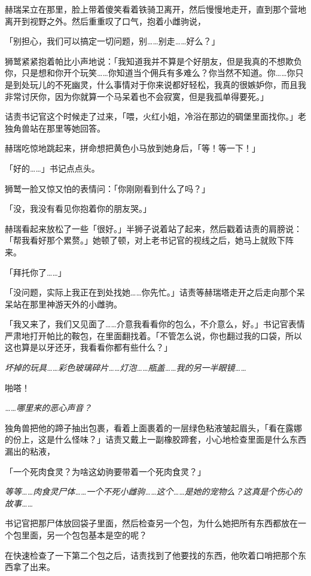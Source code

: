 赫瑞呆立在那里，脸上带着傻笑看着铁骑卫离开，然后慢慢地走开，直到那个营地离开到视野之外。然后重重叹了口气，抱着小雌驹说，

「别担心，我们可以搞定一切问题，别……别走……好么？」

狮鹫紧紧抱着帕比小声地说：「我知道我并不算是个好朋友，但是我真的不想欺负你，只是想和你开个玩笑……你知道当个佣兵有多难么？你当然不知道。你……你只是到处玩儿的不死幽灵，什么事情对于你来说都好轻松，我真的很嫉妒你，而且我非常讨厌你，因为你就算一个马呆着也不会寂寞，但是我孤单得要死。」

诘责书记官这个时候走了过来，「喂，火红小姐，冷浴在那边的碉堡里面找你。」老独角兽站在那里等她回答。

赫瑞吃惊地跳起来，拼命想把黄色小马放到她身后，「等！等一下！」

「好的……」书记点点头。

狮鹫一脸又惊又怕的表情问：「你刚刚看到什么了吗？」

「没，我没有看见你抱着你的朋友哭。」

赫瑞看起来放松了一些「很好。」半狮子说着站了起来，然后戳着诘责的肩膀说：「帮我看好那个累赘。」她顿了顿，对上老书记官的视线之后，她马上就败下阵来。

「拜托你了……」

「没问题，实际上我正在到处找她……你先忙。」诘责等赫瑞塔走开之后走向那个呆呆站在那里神游天外的小雌驹。

「我又来了，我们又见面了……介意我看看你的包么，不介意么，好。」书记官表情严肃地打开帕比的鞍包，在里面翻找着。「不管怎么说，你也翻过我的口袋，所以这也算是以牙还牙，我看看你都有些什么？」

\emph{坏掉的玩具……彩色玻璃碎片……灯泡……瓶盖……我的另一半眼镜……}


啪嗒！

\emph{……哪里来的恶心声音？}

独角兽把他的蹄子抽出包裹，看着上面裹着的一层绿色粘液皱起眉头，「看在露娜的份上，这是什么怪味？」诘责又戴上一副橡胶蹄套，小心地检查里面是什么东西漏出的粘液，

「一个死肉食灵？为啥这幼驹要带着一个死肉食灵？」

\emph{等等……肉食灵尸体……一个不死小雌驹……这个……是她的宠物么？这真是个伤心的故事……{}}

书记官把那尸体放回袋子里面，然后检查另一个包，为什么她把所有东西都放在一个包里面，另一个包包基本是空的呢？

在快速检查了一下第二个包之后，诘责找到了他要找的东西，他吹着口哨把那个东西拿了出来。

